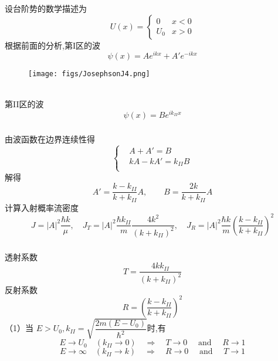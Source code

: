 \begin{frame}
  \frametitle{}
\begin{minipage}[b]{0.49\textwidth}
  \vspace{0.3em}
\解 设台阶势的数学描述为
$$
U(x)=\left\{\begin{array}{cc}
0 & x<0 \\
U_0 & x>0
\end{array}\right.
$$
根据前面的分析,第I区的波
$$
\psi(x)=A e^{i k x}+A' e^{-i k x}
$$
\end{minipage}
\begin{minipage}[b]{0.49\textwidth}
    \vspace{0.8em}
\begin{figure}[h]
  \centering
  \texttt{[image: figs/JosephsonJ4.png]}
\end{figure} 
\end{minipage}

~~\\ 
第II区的波
$$
\psi(x)=B e^{i k_{II} x}
$$
\end{frame} 

\begin{frame}
  \frametitle{}
由波函数在边界连续性得
\[\left\{\begin{aligned}
  &A+A' = B\\
  &kA-kA' = k_{II}B \\
\end{aligned}\right.\]
解得 
\[
A'=\frac{k-k_{II}}{k+k_{II}} A, \qquad
B = \frac{2k}{k+k_{II}}A \]
计算入射概率流密度
$$
J=|A|^2 \frac{\hbar k}{\mu}, \quad J_T = |A|^2 \frac{\hbar k_{II}}{m} \frac{4 k^2}{\left(k+k_{II}\right)^2}, \quad J_R = |A|^2 \frac{\hbar k}{m}\left(\frac{k-k_{II}}{k+k_{II}}\right)^2
$$
\end{frame} 

\begin{frame}
  \frametitle{}
  透射系数
  \begin{equation}\label{eq:T3}
   T=\frac{4 k k_{II}}{ (k +k_{II})^2}   
  \end{equation}
  反射系数
  \begin{equation}\label{eq:R3}
      R=\left(\frac{k-k_{II}}{k+k_{II}}\right)^2
     \end{equation}
  \emf[分析：] （1）当 $ E > U_0,
  k_{II}=\sqrt{\dfrac{2 m(E-U_0)}{\hbar^2}}
  $时,有
  $$
E \rightarrow U_0 \quad (k_{II}\rightarrow 0 ) \quad \Rightarrow \quad T \rightarrow 0 \quad\text { and } \quad R \rightarrow 1
$$
$$
E \rightarrow \infty \quad (k_{II} \rightarrow k ) \quad \Rightarrow \quad R \rightarrow 0 \quad\text { and } \quad T \rightarrow 1
$$
\end{frame} 

